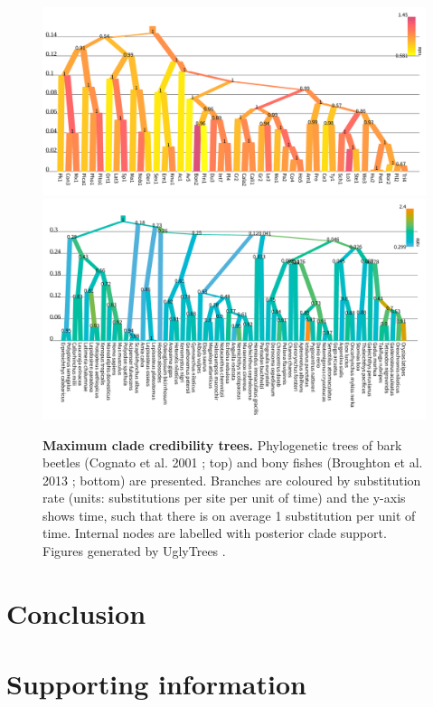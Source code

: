 \documentclass[10pt,letterpaper]{article}
\begin{document}
\begin{figure}[!h]
\includegraphics[width=\textwidth]{Figures/cognato.pdf}
\includegraphics[width=\textwidth]{Figures/broughton.pdf}
\caption{\textbf{Maximum clade credibility trees.} 
Phylogenetic trees of bark beetles (Cognato et al. 2001 \cite{Cognato_2001}; top) and bony fishes (Broughton et al. 2013 \cite{Broughton_2013}; bottom) are presented. 
Branches are coloured by substitution rate (units: substitutions per site per unit of time) and the y-axis shows time, such that there is on average 1 substitution per unit of time.
 Internal nodes are labelled with posterior clade support. Figures generated by UglyTrees \cite{uglytrees}.  }
\label{fig:parameterisationResults}
\end{figure}






\section*{Conclusion}


\newpage
\section*{Supporting information}
\end{document}
